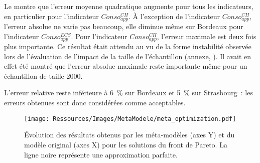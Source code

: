 Le  montre que l’erreur moyenne quadratique augmente
pour tous les indicateurs, en particulier pour l’indicateur $Conso_{app}^{CH}$.
À l’exception de l’indicateur $Conso_{app}^{CH}$, l’erreur absolue ne varie pas beaucoup,
elle diminue même sur Bordeaux pour l’indicateur $Conso_{app}^{ECS}$.
Pour l’indicateur $Conso_{app}^{CH}$, l’erreur maximale est deux fois plus importante.
Ce résultat était attendu au vu de la forme instabilité observée lors de l’évaluation de
l’impact de la taille de l’échantillon (annexe, ). Il avait en
effet été montré que l’erreur absolue maximale reste importante même pour un échantillon
de taille $2000$.

L’erreur relative reste inférieure à \SI{6}{\percent} sur Bordeaux et
\SI{5}{\percent} sur Strasbourg~: les erreurs obtenues sont donc considérées
comme acceptables.


\begin{figure}
    \centering
    \texttt{[image: Ressources/Images/MetaModele/meta\_optimization.pdf]}
    \caption[Évaluation de la précision des méta-modèles pour les solutions optimales]
            {Évolution des résultats obtenus par les méta-modèles (axes Y) et du modèle
             original (axes X) pour les solutions du front de Pareto.
             La ligne noire représente une approximation parfaite.}
    \label{fig:validite_meta_ssc_optimisation}
\end{figure}


